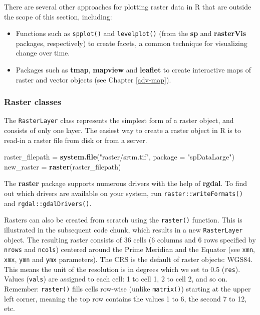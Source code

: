 \documentclass[]{krantz}
\newenvironment{Shaded}{\begin{snugshade}}{\end{snugshade}}
\newcommand{\DataTypeTok}[1]{\textcolor[rgb]{0.27,0.27,0.27}{#1}}
\newcommand{\KeywordTok}[1]{\textcolor[rgb]{0.27,0.27,0.27}{\textbf{#1}}}
\newcommand{\NormalTok}[1]{#1}
\newcommand{\StringTok}[1]{\textcolor[rgb]{0.5,0.5,0.5}{#1}}
\providecommand{\tightlist}{%
  \setlength{\itemsep}{0pt}\setlength{\parskip}{0pt}}
\begin{document}
There are several other approaches for plotting raster data in R that are outside the scope of this section, including:

\begin{itemize}
\tightlist
\item
  Functions such as \texttt{spplot()} and \texttt{levelplot()} (from the \textbf{sp} and \textbf{rasterVis} packages, respectively) to create facets, a common technique for visualizing change over time.
\item
  Packages such as \textbf{tmap}, \textbf{mapview} and \textbf{leaflet} to create interactive maps of raster and vector objects (see Chapter \ref{adv-map}).
\end{itemize}

\hypertarget{raster-classes}{%
\subsubsection{Raster classes}\label{raster-classes}}

The \texttt{RasterLayer} class represents the simplest form of a raster object, and consists of only one layer.
The easiest way to create a raster object in R is to read-in a raster file from disk or from a server.

\begin{Shaded}
\begin{Highlighting}[]
\NormalTok{raster_filepath =}\StringTok{ }\KeywordTok{system.file}\NormalTok{(}\StringTok{"raster/srtm.tif"}\NormalTok{, }\DataTypeTok{package =} \StringTok{"spDataLarge"}\NormalTok{)}
\NormalTok{new_raster =}\StringTok{ }\KeywordTok{raster}\NormalTok{(raster_filepath)}
\end{Highlighting}
\end{Shaded}

The \textbf{raster} package supports numerous drivers with the help of \textbf{rgdal}.
To find out which drivers are available on your system, run \texttt{raster::writeFormats()} and \texttt{rgdal::gdalDrivers()}.

Rasters can also be created from scratch using the \texttt{raster()} function.
This is illustrated in the subsequent code chunk, which results in a new \texttt{RasterLayer} object.
The resulting raster consists of 36 cells (6 columns and 6 rows specified by \texttt{nrows} and \texttt{ncols}) centered around the Prime Meridian and the Equator (see \texttt{xmn}, \texttt{xmx}, \texttt{ymn} and \texttt{ymx} parameters).
The CRS is the default of raster objects: WGS84.
This means the unit of the resolution is in degrees which we set to 0.5 (\texttt{res}).
Values (\texttt{vals}) are assigned to each cell: 1 to cell 1, 2 to cell 2, and so on.
Remember: \texttt{raster()} fills cells row-wise (unlike \texttt{matrix()}) starting at the upper left corner, meaning the top row contains the values 1 to 6, the second 7 to 12, etc.
\end{document}
